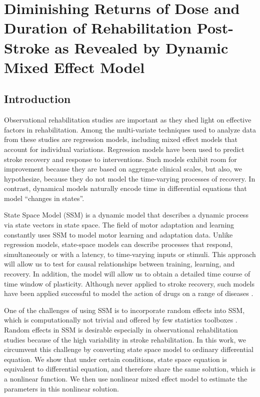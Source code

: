 \chapter{Diminishing Returns of Dose and Duration of Rehabilitation Post-Stroke as Revealed by Dynamic Mixed Effect Model}
\label{cha:dose}


\section{Introduction}
Observational rehabilitation studies are important as they shed light on effective factors in rehabilitation.
Among the multi-variate techniques used to analyze data from these studies are regression models, including mixed effect models that account for individual variations. 
Regression models have been used to predict stroke recovery  and response to interventions. 
Such models exhibit room for improvement because they are based on aggregate clinical scales, but also, we hypothesize, because they do not model the time-varying processes of recovery. 
In contrast, dynamical models naturally encode time in differential equations that model “changes in states”. 

State Space Model (SSM) is a dynamic model that describes a dynamic process via state vectors in state space.
The field of motor adaptation and learning constantly uses SSM to model motor learning and adaptation data.
Unlike regression models, state-space models can describe processes that respond, simultaneously or with a latency, to time-varying inputs or stimuli.
This approach will allow us to test for causal relationships between training, learning, and recovery. 
In addition, the model will allow us to obtain a detailed time course of time window of plasticity. 
Although never applied to stroke recovery, such models have been applied successful to model the action of drugs on a range of diseases . 

One of the challenges of using SSM is to incorporate random effects into SSM, which is computationally not trivial and offered by few statistics toolboxes .
Random effects in SSM is desirable especially in observational rehabilitation studies because of the high variability in stroke rehabilitation.
In this work, we circumvent this challenge by converting state space model to ordinary differential equation.
We show that under certain conditions, state space equation is equivalent to differential equation, and therefore share the same solution, which is a nonlinear function.
We then use nonlinear mixed effect model to estimate the parameters in this nonlinear solution.



